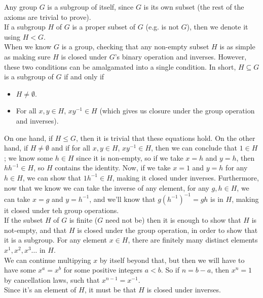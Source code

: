 \documentclass[12pt]{article}
\begin{document}
    Any group $G$ is a subgroup of itself,
    since $G$ is its own subset
    (the rest of the axioms are trivial to prove). \\
    If a subgroup $H$ of $G$ is a proper subset of $G$
    (e.g. is not $G$),
    then we denote it using $H < G$. \\

    When we know $G$ is a group,
    checking that any non-empty subset $H$ is as simple as making sure
    $H$ is closed under $G$'s binary operation and inverses.
    However, these two conditions can be amalgamated into a single
    condition.
    In short, $H \subseteq G$ is a subgroup of $G$
    if and only if
    \begin{itemize}[label=$\diamond$]
        \item
            $H \neq \emptyset$.
        \item
            For all $x, y \in H$, $xy^{-1} \in H$
            (which gives us closure under the group operation and inverses).
    \end{itemize}
    On one hand,
    if $H \leqslant G$, then it is trivial that these equations hold.
    On the other hand, if $H \neq \emptyset$
    and if for all $x, y \in H$, $xy^{-1} \in H$,
    then we can conclude that $1 \in H$;
    we know some $h \in H$ since it is non-empty,
    so if we take $x = h$ and $y = h$,
    then $hh^{-1} \in H$,
    so $H$ contains the identity.
    Now, if we take $x = 1$ and $y = h$ for any $h \in H$,
    we can show that $1h^{-1} \in H$,
    making it closed under inverses.
    Furthermore, now that we know we can take the inverse of any element,
    for any $g, h \in H$, we can take $x = g$ and $y = h^{-1}$,
    and we'll know that $g(h^{-1})^{-1} = gh$ is in $H$,
    making it closed under teh group operations. \\
    
    If the subset $H$ of $G$ is finite
    ($G$ need not be)
    then it is enough to show that $H$ is not-empty,
    and that $H$ is closed under the group operation,
    in order to show that it is a subgroup.
    For any element $x \in H$,
    there are finitely many distinct elements
    $x^1, x^2, x^3 \dots$ in $H$. \\
    We can continue multipying $x$ by itself beyond that,
    but then we will have to have some $x^a = x^b$
    for some positive integers $a < b$.
    So if $n = b-a$,
    then $x^n = 1$ by cancellation laws,
    such that $x^{n-1} = x^{-1}$. \\
    Since it's an element of $H$,
    it must be that $H$ is closed under inverses. \\
    
\end{document}
